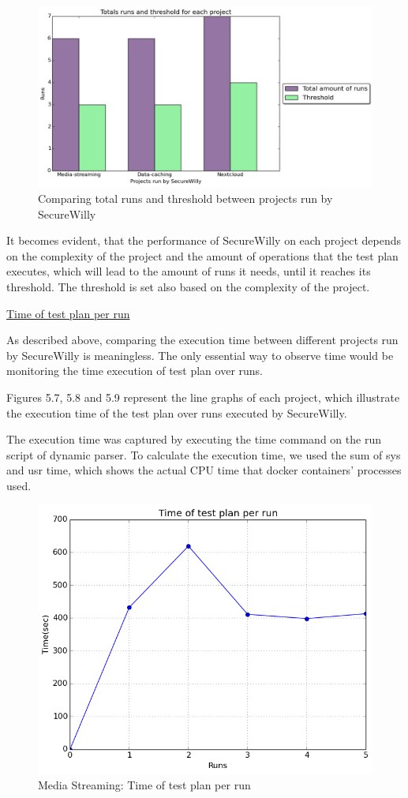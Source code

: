 \begin{figure}[h!]
  \centering
   \includegraphics[width=1\linewidth]{figures/compare.png}
   \caption{Comparing total runs and threshold between projects run by SecureWilly}
\end{figure}

It becomes evident, that the performance of SecureWilly on each project depends on the complexity of the project and the amount of operations that the test plan executes, which will lead to the amount of runs it needs, until it reaches its threshold. The threshold is set also based on the complexity of the project.

\hfill\break
\underline{Time of test plan per run}
\hfill\break

As described above, comparing the execution time between different projects run by SecureWilly is meaningless. The only essential way to observe time would be monitoring the time execution of test plan over runs.

Figures 5.7, 5.8 and 5.9 represent the line graphs of each project, which illustrate the execution time of the test plan over runs executed by SecureWilly.

The execution time was captured by executing the time command on the run script of dynamic parser. To calculate the execution time, we used the sum of sys and usr time, which shows the actual CPU time that docker containers' processes used.

\begin{figure}[h!]
  \centering
   \includegraphics[width=0.70\linewidth]{figures/mediastreaming/time.png}
   \caption{Media Streaming: Time of test plan per run}
\end{figure}

